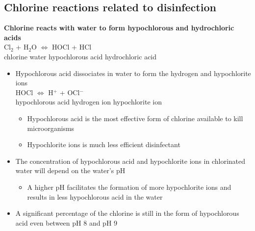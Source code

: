\subsection{Chlorine reactions related to disinfection}


\textbf{Chlorine reacts with water to form hypochlorous and hydrochloric acids}\\
Cl$_2$ \hspace{0.8cm}	+ \hspace{0.3 cm}	 H$_2$O		\hspace{0.8cm} $\iff$ 
\hspace{0.8cm} HOCl	\hspace{0.8cm}	 +	\hspace{0.8cm}	 HCl \\
chlorine \hspace{0.8cm}	water \hspace{1.8cm}		 hypochlorous acid	\hspace{0.1cm}	 hydrochloric acid\\ 
	\vspace{0.5cm}
	\begin{itemize}
		\item Hypochlorous acid dissociates in water to form the hydrogen and hypochlorite ions\\
 HOCl \hspace{1.8 cm} $\iff$ \hspace{1.8 cm} H$^+$ \hspace{1.8cm} + 	\hspace{0.8cm}OCl$^-$\\ 
hypochlorous acid  \hspace{1.9 cm}      hydrogen ion   \hspace{1.5cm}           hypochlorite ion

		\begin{itemize}
			\item Hypochlorous acid is the most effective form of chlorine available to kill microorganisms
			\item Hypochlorite ions is much less efficient disinfectant
		\end{itemize}

		\item The concentration of hypochlorous acid and hypochlorite ions in chlorinated water will depend on the water's pH
		\begin{itemize}
			\item A higher pH facilitates the formation of more hypochlorite ions and results in less hypochlorous acid in the water
		\end{itemize}
		\item A significant percentage of the chlorine is still in the form of hypochlorous acid even between pH 8 and pH 9
		\end{itemize}


